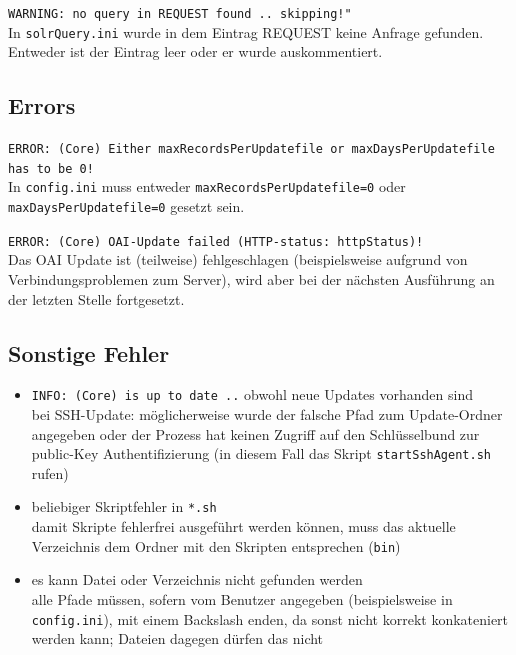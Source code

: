 \documentclass[10pt]{article}
\begin{document}
\texttt{WARNING: no query in REQUEST found .. skipping!"} \\
In \texttt{solrQuery.ini} wurde in dem Eintrag REQUEST keine Anfrage gefunden. Entweder ist der Eintrag leer oder er wurde auskommentiert.


\subsection{Errors}
\texttt{ERROR: (Core) Either maxRecordsPerUpdatefile or maxDaysPerUpdatefile has to be 0!} \\
In \texttt{config.ini} muss entweder \texttt{maxRecordsPerUpdatefile=0} oder \texttt{maxDaysPerUpdatefile=0} gesetzt sein.

\texttt{ERROR: (Core) OAI-Update failed (HTTP-status: httpStatus)!} \\
Das OAI Update ist (teilweise) fehlgeschlagen (beispielsweise aufgrund von Verbindungsproblemen zum Server), wird aber bei der nächsten Ausführung an der letzten Stelle fortgesetzt.

\newpage
\subsection{Sonstige Fehler}
\begin{itemize}
	\item \texttt{INFO: (Core) is up to date ..} obwohl neue Updates vorhanden sind \\
		bei SSH-Update: möglicherweise wurde der falsche Pfad zum Update-Ordner angegeben oder der Prozess hat keinen Zugriff auf den Schlüsselbund zur public-Key Authentifizierung (in diesem Fall das Skript \texttt{startSshAgent.sh} rufen)
		
	\item beliebiger Skriptfehler in \texttt{*.sh} \\
		damit Skripte fehlerfrei ausgeführt werden können, muss das aktuelle Verzeichnis dem Ordner mit den Skripten entsprechen (\texttt{bin})
		
	\item es kann Datei oder Verzeichnis nicht gefunden werden \\
		alle Pfade müssen, sofern vom Benutzer angegeben (beispielsweise in \texttt{config.ini}), mit einem Backslash enden, da sonst nicht korrekt konkateniert werden kann; Dateien dagegen dürfen das nicht
\end{itemize}




\newpage
\end{document}
